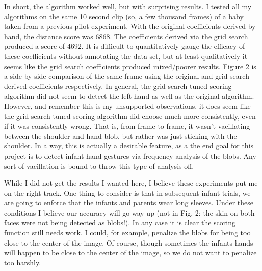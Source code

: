 \documentclass[11pt]{article}
\begin{document}
In short, the algorithm worked well, but with surprising results. I tested all my algorithms on the same 10 second clip (so, a few thousand frames) of a baby taken from a previous pilot experiment. With the original coefficients derived by hand, the distance score was 6868. The coefficients derived via the grid search produced a score of 4692. It is difficult to quantitatively gauge the efficacy of these coefficients without annotating the data set, but at least qualitatively it seems like the grid search coefficients produced mixed/poorer results. Figure 2 is a side-by-side comparison of the same frame using the original and grid search-derived coefficients respectively. In general, the grid search-tuned scoring algorithm did not seem to detect the left hand as well as the original algorithm. However, and remember this is my unsupported observations, it does seem like the grid search-tuned scoring algorithm did choose much more consistently, even if it was consistently wrong. That is, from frame to frame, it wasn't vacillating between the shoulder and hand blob, but rather was just sticking with the shoulder. In a way, this is actually a desirable feature, as a the end goal for this project is to detect infant hand gestures via frequency analysis of the blobs. Any sort of vacillation is bound to throw this type of analysis off. 

While I did not get the results I wanted here, I believe these experiments put me on the right track. One thing to consider is that in subsequent infant trials, we are going to enforce that the infants and parents wear long sleeves. Under these conditions I believe our accuracy will go way up (not in Fig. 2: the skin on both faces were not being detected as blobs!). In any case it is clear the scoring function still needs work. I could, for example, penalize the blobs for being too close to the center of the image. Of course, though sometimes the infants hands will happen to be close to the center of the image, so we do not want to penalize too harshly.
\end{document}
